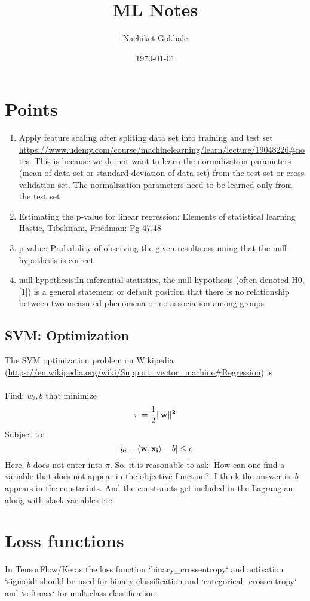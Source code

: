 \documentclass{article}
\newcommand{\beq}{\begin{equation}}
\newcommand{\eeq}{\end{equation}}
\begin{document}
\title{ML Notes}
\author{Nachiket Gokhale}
\date{\today}
\maketitle
\section{Points}
\begin{enumerate}
  \item{Apply feature scaling  after spliting data set into training and test set
    \url{https://www.udemy.com/course/machinelearning/learn/lecture/19048226#notes}. This is because we do not want to learn the normalization parameters  (mean of data set or standard deviation of data set) from the test set or cross validation set. The normalization parameters need to be learned only from the test set}
  \item{Estimating the p-value for linear regression: Elements of statistical learning Hastie, Tibshirani, Friedman: Pg 47,48}
  \item{p-value: Probability of observing the given results assuming that the null-hypothesis is correct}
  \item{null-hypothesis:In inferential statistics, the null hypothesis (often denoted H0,[1]) is a general statement or default position that there is no relationship between two measured phenomena or no association among groups}
\end{enumerate}
\subsection{SVM: Optimization}
The SVM optimization problem on Wikipedia (\url{https://en.wikipedia.org/wiki/Support_vector_machine#Regression}) is\\\\
Find: $w_i, b$ that minimize
\beq
\pi = \frac{1}{2}\|\bf{w}\|^2
\eeq
Subject to:
\beq
|y_i -  \langle {\bf{w}},{\bf{x}_i} \rangle - b | \le \epsilon
\eeq
Here, $b$ does not enter into $\pi$. So, it is reasonable to ask: How can one find a variable that does not appear in the objective function?. I think the answer is: $b$ appears in the constraints. And the constraints get included in the Lagrangian, along with slack variables etc.
\section{Loss functions}
In TensorFlow/Keras the loss function `binary\_crossentropy` and activation `sigmoid` should be used for binary classification and `categorical\_crossentropy` and `softmax` for multiclass classification.
\end{document}
